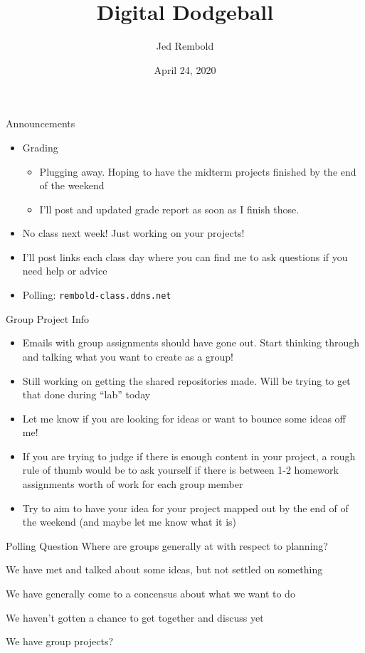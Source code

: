 \documentclass[pdf, aspectratio=169, 12pt]{beamer}
\title{Digital Dodgeball}
\author{Jed Rembold}
\date{April 24, 2020}
\begin{document}
\begin{frame}{Announcements}
	\begin{itemize}
		\item Grading
			\begin{itemize}
				\item Plugging away. Hoping to have the midterm projects finished by the end of the weekend
				\item I'll post and updated grade report as soon as I finish those.
			\end{itemize}
		\item No class next week! Just working on your projects!
		\item I'll post links each class day where you can find me to ask questions if you need help or advice
		\item Polling: \nolinkurl{rembold-class.ddns.net}
	\end{itemize}
\end{frame}

\begin{frame}{Group Project Info}
		\begin{itemize}
			\item Emails with group assignments should have gone out. Start thinking through and talking what you want to create as a group!
			\item Still working on getting the shared repositories made. Will be trying to get that done during ``lab'' today
			\item Let me know if you are looking for ideas or want to bounce some ideas off me!
			\item If you are trying to judge if there is enough content in your project, a rough rule of thumb would be to ask yourself if there is between 1-2 homework assignments worth of work for each group member
			\item Try to aim to have your idea for your project mapped out by the end of of the weekend (and maybe let me know what it is)
		\end{itemize}
\end{frame}

\begin{frame}[fragile]{Polling Question}
	Where are groups generally at with respect to planning?
	\begin{poll}
		\item We have met and talked about some ideas, but not settled on something
		\item We have generally come to a concensus about what we want to do
		\item We haven't gotten a chance to get together and discuss yet
		\item We have group projects?
	\end{poll}
\end{frame}
\end{document}

